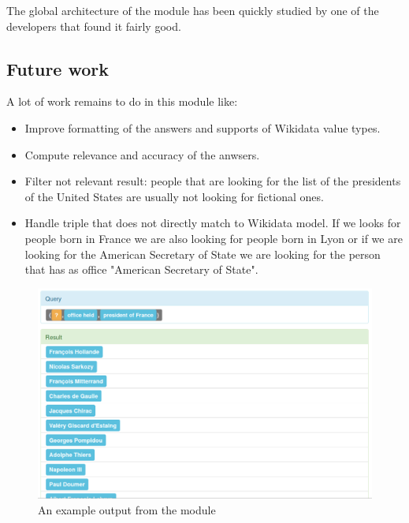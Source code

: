 The global architecture of the module has been quickly studied by one of the \Wikidata developers that found it fairly good.

\subsection{Future work}
A lot of work remains to do in this module like:
\begin{itemize}
    \item Improve formatting of the answers and supports of Wikidata value types.
    \item Compute relevance and accuracy of the anwsers.
    \item Filter not relevant result: people that are looking for the list of the presidents of the United States are usually not looking for fictional ones.
    \item Handle triple that does not directly match to Wikidata model. If we looks for people born in France we are also looking for people born in Lyon or if we are looking for the American Secretary of State we are looking for the person that has as office "American Secretary of State".
\end{itemize}

\begin{figure}[!ht]
  \centering
    \label{struct}
    \caption{An example output from the \Wikidata module}
    \includegraphics[width=\textwidth]{./wikidata_list_presidents.png}
\end{figure}
